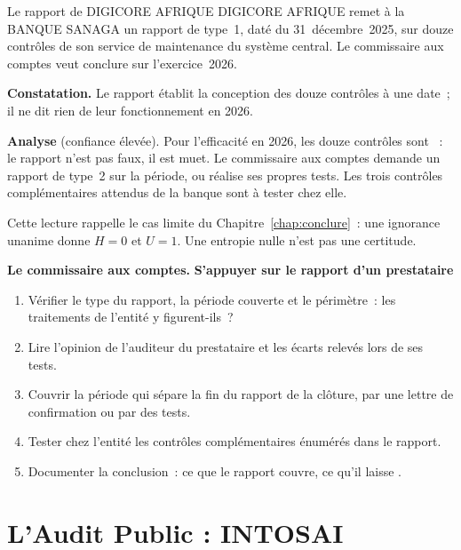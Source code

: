 \begin{boxlecture}{Le rapport de DIGICORE AFRIQUE}
DIGICORE AFRIQUE remet à la BANQUE SANAGA un rapport de type~1, daté du
31~décembre~2025, sur douze contrôles de son service de maintenance du
système central. Le commissaire aux comptes veut conclure sur
l'exercice~2026.

\medskip
\textbf{Constatation.} Le rapport établit la conception des douze contrôles
à une date~; il ne dit rien de leur fonctionnement en 2026.

\medskip
\textbf{Analyse} (confiance élevée). Pour l'efficacité en 2026, les douze
contrôles sont \NEK{}~: le rapport n'est pas faux, il est muet. Le
commissaire aux comptes demande un rapport de type~2 sur la période, ou
réalise ses propres tests. Les trois contrôles complémentaires attendus de
la banque sont à tester chez elle.

\medskip
\hfill{}
\end{boxlecture}

Cette lecture rappelle le cas limite du Chapitre~\ref{chap:conclure}~:
une ignorance unanime donne $H = 0$ et $U = 1$. Une entropie nulle n'est
pas une certitude.

\begin{boxinfo}
\textbf{Le commissaire aux comptes.}
\textbf{S'appuyer sur le rapport d'un prestataire}
\begin{enumerate}
    \item Vérifier le type du rapport, la période couverte et le périmètre~:
          les traitements de l'entité y figurent-ils~?
    \item Lire l'opinion de l'auditeur du prestataire et les écarts relevés
          lors de ses tests.
    \item Couvrir la période qui sépare la fin du rapport de la clôture,
          par une lettre de confirmation ou par des tests.
    \item Tester chez l'entité les contrôles complémentaires énumérés dans
          le rapport.
    \item Documenter la conclusion~: ce que le rapport couvre, ce qu'il
          laisse \NEK{}.
\end{enumerate}
\end{boxinfo}

\section{L'Audit Public : INTOSAI}
\label{sec:c13-public}
